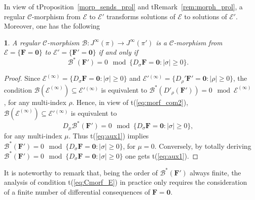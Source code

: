 \documentclass[12pt,english]{elsarticle}
\theoremstyle{plain}
\theoremstyle{plain}
\newtheorem{prop}[thm]{\protect\propositionname}
\theoremstyle{remark}
\theoremstyle{plain}
\theoremstyle{definition}
\theoremstyle{definition}
\providecommand{\propositionname}{Proposition}
\begin{document}
In view of t{Proposition~\ref{morp_sends_prol}} and t{Remark~\ref{rem:morph_prol}}, a regular $\mathcal{C}$-morphism from
$\mathcal{E}$ to $\mathcal{E}'$ transforms solutions of
$\mathcal{E}$ to solutions of $\mathcal{E}'$. Moreover, one has the following
%
\begin{prop}
\label{prop6}
A regular $\mathcal{C}$-morphism
$\mathcal{B}:J^{\infty}(\pi )\rightarrow J^{\infty}(\pi ')$ is a
$\mathcal{C}$-morphism from $\mathcal{E}=\{\mathbf{F}=\mathbf{0}\}$ to
$\mathcal{E}'=\{\mathbf{F'}=\mathbf{0}\}$ if and only if
%
\begin{equation}
\mathcal{B}^{*}(\mathbf{F'})=0
\mod{\{D{}_{\sigma}\mathbf{F}=\mathbf{0}:|\sigma |\geq 0\}}.
\label{eq:Cmorf_E}
\end{equation}
%
\end{prop}

\begin{proof}
Since
$\mathcal{E}^{(\infty )}=\{D{}_{\sigma}\mathbf{F}=\mathbf{0}:|\sigma |
\geq 0\}$ and
$\mathcal{E}'{}^{(\infty )}=\{D{}_{\rho}'\mathbf{F}'=\mathbf{0}:|
\rho |\geq 0\}$, the condition
$\mathcal{B}(\mathcal{E}^{(\infty )})\subseteq \mathcal{E}'{}^{(
\infty )}$ is equivalent to
$\mathcal{B}^{*}\left (D'_{\rho}\left (\mathbf{F}'\right )\right )=0
\mod{\mathcal{E}^{(\infty )}}$, for any multi-index $\rho $. Hence, in
view of t{(\ref{eq:morf_com2})},
$\mathcal{B}(\mathcal{E}^{(\infty )})\subseteq \mathcal{E}'{}^{(
\infty )}$ is equivalent to
%
\begin{equation}
D_{\mu}\mathcal{B}^{*}\left (\mathbf{F}'\right )=0
\mod{\{D{}_{\sigma}\mathbf{F}=\mathbf{0}:|\sigma |\geq 0\}},
\label{eq:aux1}
\end{equation}
%
for any multi-index $\mu $. Thus t{(\ref{eq:aux1})} implies
$\mathcal{B}^{*}(\mathbf{F'})=0
\mod{\{D{}_{\sigma}\mathbf{F}=\mathbf{0}:|\sigma |\geq 0\}}$, for
$\mu =0$. Conversely, by totally deriving
$\mathcal{B}^{*}(\mathbf{F'})=0
\mod{\{D{}_{\sigma}\mathbf{F}=\mathbf{0}:|\sigma |\geq 0\}}$ one gets t{(\ref{eq:aux1})}.
\end{proof}
%
  It is noteworthy to remark that, being the order of
$\mathcal{B}^{*}(\mathbf{F'})$ always finite, the analysis of condition
t{(\ref{eq:Cmorf_E})} in practice only requires the consideration of a finite
number of differential consequences of $\mathbf{F=0}$.
\end{document}
